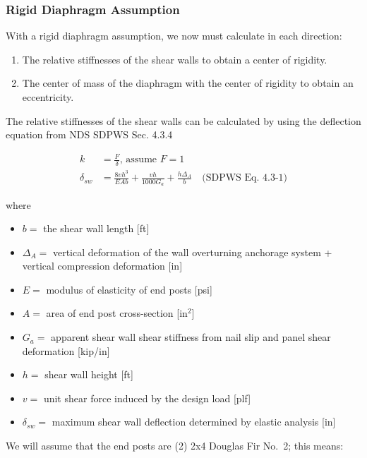 \documentclass[11pt]{article}
\providecommand{\tightlist}{%
      \setlength{\itemsep}{0pt}\setlength{\parskip}{0pt}}
\begin{document}
    
    \subsubsection{Rigid Diaphragm
Assumption}\label{rigid-diaphragm-assumption}

    With a rigid diaphragm assumption, we now must calculate in each
direction:

\begin{enumerate}
\def\labelenumi{\arabic{enumi}.}
\tightlist
\item
  The relative stiffnesses of the shear walls to obtain a center of
  rigidity.
\item
  The center of mass of the diaphragm with the center of rigidity to
  obtain an eccentricity.
\end{enumerate}

The relative stiffnesses of the shear walls can be calculated by using
the deflection equation from NDS SDPWS Sec. 4.3.4

\begin{align*}
k &= \frac{F}{\delta},\, \text{assume }F = 1 \\
\delta_{sw} &= \frac{8vh^3}{EAb} + \frac{vh}{1000 G_a} + \frac{h \Delta_A}{b}\quad \text{(SDPWS Eq. 4.3-1)}
\end{align*}

where

\begin{itemize}
\tightlist
\item
  \(b =\) the shear wall length {[}ft{]}
\item
  \(\Delta_A =\) vertical deformation of the wall overturning anchorage
  system + vertical compression deformation {[}in{]}
\item
  \(E =\) modulus of elasticity of end posts {[}psi{]}
\item
  \(A =\) area of end post cross-section {[}in\(^2\){]}
\item
  \(G_a =\) apparent shear wall shear stiffness from nail slip and panel
  shear deformation {[}kip/in{]}
\item
  \(h =\) shear wall height {[}ft{]}
\item
  \(v =\) unit shear force induced by the design load {[}plf{]}
\item
  \(\delta_{sw} =\) maximum shear wall deflection determined by elastic
  analysis {[}in{]}
\end{itemize}

We will assume that the end posts are (2) 2x4 Douglas Fir No.~2; this
means:
\end{document}
